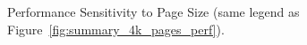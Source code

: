 \begin{figure}[tp] 
\vspace{0. in} \centering
\centerline{}

\caption{\small Performance Sensitivity to Page Size (same legend as
Figure~\ref{fig:summary_4k_pages_perf}). \normalsize}

\label{fig:summary_pagesize} 
\vspace{-0. in}
\end{figure}

% 
% 
